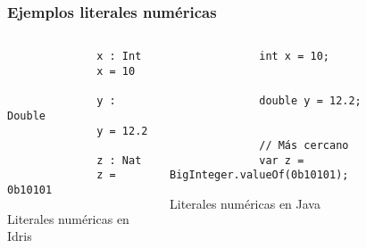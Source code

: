 \documentclass{beamer}
\begin{document}
\begin{frame}[fragile]
  \frametitle{Ejemplos literales numéricas}
  \begin{columns}[T]

    \begin{column}{.38\textwidth}
      \begin{listing}[H]
        \begin{center}
          \begin{minipage}{0.6\textwidth}
              \begin{verbatim}
              x : Int
              x = 10

              y : Double
              y = 12.2

              z : Nat
              z = 0b10101
              \end{verbatim}
          \end{minipage}
        \end{center}
        \caption{Literales numéricas en Idris}
        \label{lst:litnumidris}
      \end{listing}
    \end{column}


    \hspace{-0.05\textwidth}
    \vrule
    \hspace{0.025\textwidth}

    \begin{column}{.58\textwidth}
      \begin{listing}[H]
        \begin{center}
          \begin{minipage}{\textwidth}
              \begin{verbatim}
              int x = 10;


              double y = 12.2;


              // Más cercano
              var z = BigInteger.valueOf(0b10101);
              \end{verbatim}
          \end{minipage}
        \end{center}
        \caption{Literales numéricas en Java}
        \label{lst:litnumjava}
      \end{listing}
    \end{column}

  \end{columns}
\end{frame}
\end{document}
